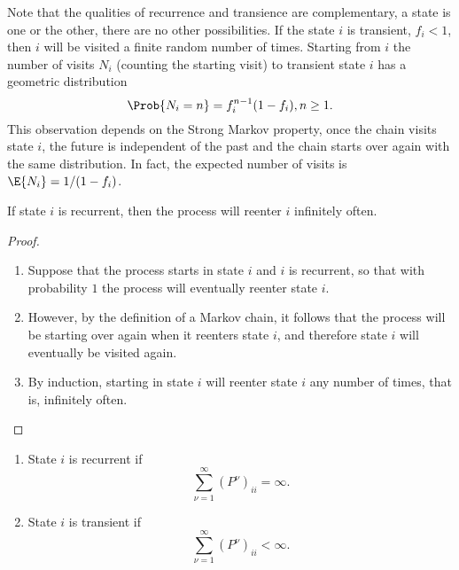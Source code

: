 \documentclass[12pt]{article}
\begin{document}
\begin{remark}
    Note that the qualities of recurrence and transience are
    complementary, a state is one or the other, there are no other
    possibilities. If the state \( i \) is transient, \( f_i < 1 \),
    then \( i \) will be visited a finite random number of times.
    Starting from \( i \) the number of visits \( N_i \) (counting the
    starting visit) to transient state \( i \) has a geometric
    distribution
    \[
        \Prob{N_i = n} = f_i^{n-1}(1 - f_i), n \ge 1.
    \] This observation depends on the Strong Markov property, once the
    chain visits state \( i \), the future is independent of the past
    and the chain starts over again with the same distribution.  In
    fact, the expected number of visits is \( \E{N_i} = 1/(1 - f_i) \).
\end{remark}

\begin{proposition}
    If state \( i \) is recurrent, then the process will reenter \( i \)
    infinitely often.
\end{proposition}

\begin{proof}
    \begin{enumerate}
        \item
            Suppose that the process starts in state \( i \) and \( i \)
            is recurrent, so that with probability \( 1 \) the process
            will eventually reenter state \( i \).
        \item
            However, by the definition of a Markov chain, it follows
            that the process will be starting over again when it
            reenters state \( i \), and therefore state \( i \) will
            eventually be visited again.
        \item
            By induction, starting in state \( i \) will reenter state \(
            i \) any number of times, that is, infinitely often.
    \end{enumerate}
\end{proof}

\begin{proposition}
    \begin{enumerate}
        \item
            State \( i \) is recurrent if
            \[
                \sum\limits_{\nu=1}^{\infty} (P^{\nu})_{ii} = \infty.
            \]
        \item
            State \( i \) is transient if
            \[
                \sum\limits_{\nu=1}^{\infty} (P^\nu)_{ii} < \infty.
            \]
    \end{enumerate}
\end{proposition}
\end{document}
